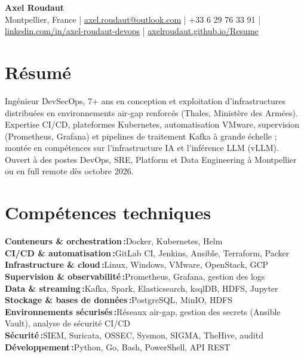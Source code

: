 \documentclass[10pt,a4paper]{article}
\newcommand{\skillrow}[2]{\textbf{#1\,:}\hspace{0.35em}#2\\}
\begin{document}
{\Huge\bfseries\color{accent}Axel Roudaut}\\[3pt]
{\small\color{muted}%
Montpellier, France \enspace|\enspace
\href{mailto:axel.roudaut@outlook.com}{axel.roudaut@outlook.com} \enspace|\enspace
+33 6 29 76 33 91 \enspace|\enspace
\href{https://www.linkedin.com/in/axel-roudaut-devops/}{linkedin.com/in/axel-roudaut-devops} \enspace|\enspace
\href{https://axelroudaut.github.io/Resume/}{axelroudaut.github.io/Resume}}

\section{Résumé}
Ingénieur DevSecOps, 7+ ans en conception et exploitation d'infrastructures distribuées en
environnements air-gap renforcés (Thales, Ministère des Armées). Expertise CI/CD, plateformes Kubernetes,
automatisation VMware, supervision (Prometheus, Grafana) et pipelines de traitement Kafka à grande échelle ; montée en compétences sur l'infrastructure
IA et l'inférence LLM (vLLM). Ouvert à des postes DevOps, SRE, Platform et Data Engineering à Montpellier ou en full remote
dès octobre 2026.

\section{Compétences techniques}
\skillrow{Conteneurs \& orchestration}{Docker, Kubernetes, Helm}
\skillrow{CI/CD \& automatisation}{GitLab CI, Jenkins, Ansible, Terraform, Packer}
\skillrow{Infrastructure \& cloud}{Linux, Windows, VMware, OpenStack, GCP}
\skillrow{Supervision \& observabilité}{Prometheus, Grafana, gestion des logs}
\skillrow{Data \& streaming}{Kafka, Spark, Elasticsearch, ksqlDB, HDFS, Jupyter}
\skillrow{Stockage \& bases de données}{PostgreSQL, MinIO, HDFS}
\skillrow{Environnements sécurisés}{Réseaux air-gap, gestion des secrets (Ansible Vault), analyse de sécurité CI/CD}
\skillrow{Sécurité}{SIEM, Suricata, OSSEC, Sysmon, SIGMA, TheHive, auditd}
\skillrow{Développement}{Python, Go, Bash, PowerShell, API REST}
\end{document}
